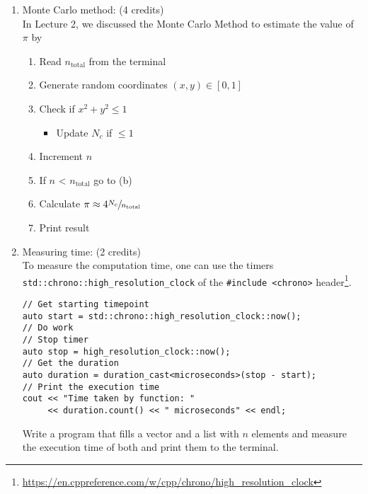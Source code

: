 \documentclass[11pt]{article}
\begin{document}
\begin{enumerate}

\item Monte Carlo method: (4 credits)\\
In Lecture 2, we discussed the Monte Carlo Method to estimate the value of $\pi$ by
\begin{enumerate}
\item Read $n_{\text{total}}$ from the terminal
\item Generate random coordinates $(x,y)\in [0,1]$
\item Check if $x^2+y^2 \leq 1$
\begin{itemize}
\item Update $N_c$ if $\leq 1$
\end{itemize}
\item Increment $n$ 
\item If $n$ < $n_{\text{total}}$ go to (b)
\item Calculate $\pi \approx 4 \sfrac{N_c}{n_\text{total}}$
\item Print result
\end{enumerate}

\item Measuring time: (2 credits)\\
To measure the computation time, one can use the timers \lstinline|std::chrono::high_resolution_clock| of the \lstinline|#include <chrono>| header\footnote{\url{https://en.cppreference.com/w/cpp/chrono/high_resolution_clock}}.
\begin{lstlisting}
// Get starting timepoint 
auto start = std::chrono::high_resolution_clock::now(); 
// Do work
// Stop timer
auto stop = high_resolution_clock::now();
// Get the duration
auto duration = duration_cast<microseconds>(stop - start); 
// Print the execution time  
cout << "Time taken by function: "
     << duration.count() << " microseconds" << endl; 
\end{lstlisting} 
Write a program that fills a vector and a list with $n$ elements and measure the execution time of both and print them to the terminal. 


\end{enumerate}

\doclicenseThis 
\end{document}
